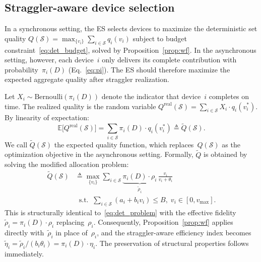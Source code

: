 \documentclass[a4paper,fleqn]{cas-dc}
\newcommand{\Sset}{\mathcal{S}}
\newcommand{\vmax}{v_{\max}}
\begin{document}
	\subsection{Straggler-aware device selection}\label{sec:sa_select}
	
	In a synchronous setting, the ES selects devices to maximize the
	deterministic set quality
	$Q(\Sset) = \max_{\{v_i\}} \sum_{i \in \Sset} q_i(v_i)$ subject to
	budget constraint~\eqref{eq:det_budget}, solved by
	Proposition~\ref{prop:wf}.  In the asynchronous setting, however,
	each device~$i$ only delivers its complete contribution with
	probability~$\pi_i(D)$ (Eq.~\ref{eq:pi}).  The ES should therefore
	maximize the expected aggregate quality after straggler realization.
	
	Let $X_i \sim \mathrm{Bernoulli}(\pi_i(D))$ denote the indicator
	that device~$i$ completes on time.  The realized quality is the
	random variable
	$Q^{\mathrm{real}}(\Sset) = \sum_{i \in \Sset} X_i \cdot
	q_i(v_i^*)$.  By linearity of expectation:
	\begin{equation}\label{eq:expected_quality}
		\mathbb{E}\bigl[Q^{\mathrm{real}}(\Sset)\bigr]
		= \sum_{i \in \Sset} \pi_i(D) \cdot q_i(v_i^*)
		\triangleq \tilde{Q}(\Sset).
	\end{equation}
	We call $\tilde{Q}(\Sset)$ the expected quality function, which
	replaces~$Q(\Sset)$ as the optimization objective in the asynchronous
	setting.  Formally, $\tilde{Q}$ is obtained by solving the modified
	allocation problem:
	\begin{subequations}\label{eq:async_problem}
		\begin{align}
			\tilde{Q}(\Sset)
			&\triangleq \max_{\{v_i\}}
			\sum_{i \in \Sset}
			\underbrace{\pi_i(D) \cdot \rho_i}_{\tilde{\rho}_i}
			\,\frac{v_i}{v_i + \theta_i}
			\label{eq:async_obj} \\
			&\;\;\text{s.t.}\;\;
			\textstyle\sum_{i \in \Sset}(a_i + b_i v_i) \leq B,\;
			v_i \in [0, \vmax].
			\label{eq:async_budget}
		\end{align}
	\end{subequations}
	This is structurally identical to~\eqref{eq:det_problem} with the
	effective fidelity $\tilde{\rho}_i = \pi_i(D) \cdot \rho_i$
	replacing~$\rho_i$.  Consequently, Proposition~\ref{prop:wf} applies
	directly with~$\tilde{\rho}_i$ in place of~$\rho_i$, and the
	straggler-aware efficiency index becomes
	$\tilde{\eta}_i = \tilde{\rho}_i / (b_i \theta_i)
	= \pi_i(D) \cdot \eta_i$.
	The preservation of structural properties follows immediately.
	
\end{document}
